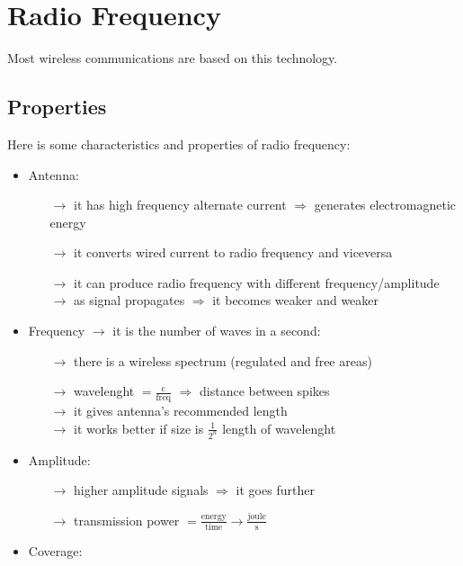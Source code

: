 \section{Radio Frequency}
Most wireless communications are based on this technology.
\subsection{Properties}
Here is some characteristics and properties of radio frequency:
\begin{itemize}
    \item Antenna:
    \begin{itemize}
        \item[$\rightarrow$] it has high frequency alternate current
        $\Rightarrow$ generates electromagnetic\\energy
        \item[$\rightarrow$] it converts wired current to radio
        frequency and viceversa
        \item[$\rightarrow$] it can produce radio frequency
        with different frequency/amplitude\\
        $\rightarrow$ as signal propagates $\Rightarrow$ it becomes
        weaker and weaker
    \end{itemize}
    \item Frequency $\rightarrow$ it is the number of waves in a second:
    \begin{itemize}
        \item[$\rightarrow$] there is a wireless spectrum
        (regulated and free areas)
        \item[$\rightarrow$] wavelenght $= \frac{\text{c}}{\text{freq}}$
        $\Rightarrow$ distance between spikes\\
        $\rightarrow$ it gives antenna's recommended length\\
        $\rightarrow$ it works better if size is $\frac{1}{2^n}$
        length of wavelenght
    \end{itemize}
    \item Amplitude:
    \begin{itemize}
        \item[$\rightarrow$] higher amplitude signals $\Rightarrow$ it goes
        further
        \item[$\rightarrow$] transmission power $= \frac{\text{energy}}{\text{time}}
        \rightarrow \frac{\text{joule}}{\text{s}}$
    \end{itemize}
    \item Coverage:

\end{itemize}
